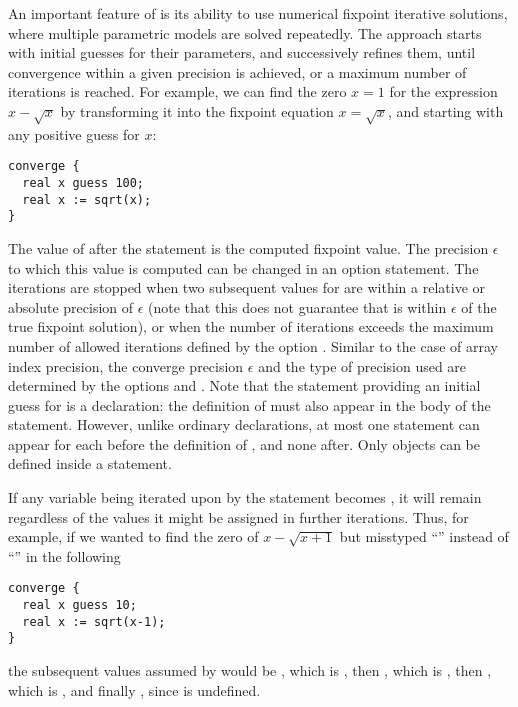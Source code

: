 An important feature of {\smart} is its ability to use numerical fixpoint
iterative solutions, where multiple parametric models are solved repeatedly.
The approach starts with initial guesses for their parameters, and successively
refines them, until convergence within a given precision is achieved,
or a maximum number of iterations is reached.
For example, we can find the zero $x=1$ for the expression
$x - \sqrt{x}$ by transforming it into the fixpoint equation $x = \sqrt{x}$,
and starting with any positive guess for $x$:
\begin{lstlisting}
converge {
  real x guess 100;
  real x := sqrt(x);
}
\end{lstlisting}
The value of  after the  statement is the computed
fixpoint value.  The precision $\epsilon$ to which this value is
computed can be changed in an option statement.  The iterations are
stopped when two subsequent values for  are within a relative or
absolute precision of $\epsilon$ (note that this does not guarantee that 
 is within $\epsilon$ of the true fixpoint solution), or when the
number of iterations exceeds the maximum number of allowed iterations 
defined by the option .
Similar to the case of array index precision, the converge precision $\epsilon$ 
and the type of precision used are determined by the options 
 and .
Note that the statement providing an initial guess for 
is a declaration: the definition of  must also appear in the
body of the  statement.
However, unlike ordinary declarations, at most one  statement
can appear for each  before the definition of ,
and none after.
Only  objects can be defined inside a 
statement.

If any variable being iterated upon by the  statement becomes
, it will remain  regardless of the values it might
be assigned in further iterations.
Thus, for example, if we wanted to find the zero of $x - \sqrt{x+1}$
but misstyped ``'' instead of ``'' in the following
\begin{lstlisting}
converge {
  real x guess 10;
  real x := sqrt(x-1);
}
\end{lstlisting}
the subsequent values assumed by  would be
, which is  , then
, which is , then
, which is , and finally
, since  is undefined.

